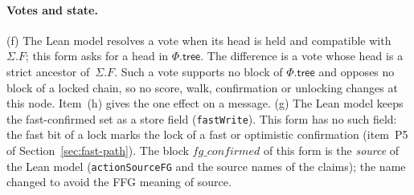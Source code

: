 \documentclass{article}
\newcommand{\Fr}{\Phi}
\newcommand{\tree}{\mathsf{tree}}
\begin{document}
\paragraph{Votes and state.}
(f) The Lean model resolves a vote when its head is held and compatible
with~$\Sigma.F$; this form asks for a head in $\Fr.\tree$.  The
difference is a vote whose head is a strict ancestor of~$\Sigma.F$.  Such
a vote supports no block of $\Fr.\tree$ and opposes no block of a locked
chain, so no score, walk, confirmation or unlocking changes at this node.
Item~(h) gives the one effect on a message.
(g) The Lean model keeps the fast-confirmed set as a store field
(\texttt{fastWrite}).  This form has no such field: the fast bit of a lock
marks the lock of a fast or optimistic confirmation (item~P5 of
Section~\ref{sec:fast-path}).  The block $\mathit{fg\_confirmed}$ of this form is
the \emph{source} of the Lean model (\texttt{actionSourceFG} and the
source names of the claims); the name changed to avoid the FFG meaning of
source.
\end{document}
